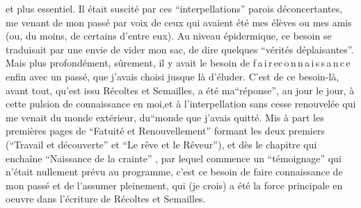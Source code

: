 
et plus essentiel. Il était suscité par ces ``interpellations'' parois déconcertantes, me venant de mon passé  par  voix  de ceux qui avaient été mes élèves ou mes amis (ou, du moins, de certains d'entre eux). Au niveau épidermique, ce besoin se traduisait par une envie de vider  mon sac, de dire quelques ``vérités déplaisantes''. Mais plus profondément, sûrement, il y avait le besoin de \mbox{f\,a\,i\,r\,e\quad c\,o\,n\,n\,a\,i\,s\,s\,a\,n\,c\,e} enfin avec un passé, que j'avais choisi jusque là d'éluder. C'est de ce besoin-là, avant tout, qu'est issu Récoltes et Semailles,  a été ma``réponse'', au jour le jour, à cette pulsion de connaissance en moi,et à l'interpellation sans cesse renouvelée qui me venait du monde extérieur, du``monde  que j'avais quitté.  Mis à part les  premières  pages de  ``Fatuité et Renouvellement''  formant les deux premiers (``Travail et découverte'' et ``Le rêve et le Rêveur''), et dès le chapitre qui enchaîne ``Naissance de la crainte'' , par lequel commence  un ``témoignage'' qui n'était nullement prévu au programme, c'est ce besoin de faire connaissance de mon passé et de l'assumer pleinement, qui (je crois) a été la force principale en oeuvre dans l'écriture de Récoltes et Semailles.

